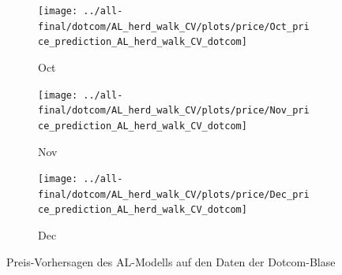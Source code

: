 \documentclass[ngerman]{ttlab-qualify}
\begin{document}
\begin{figure}[H]
\begin{subfigure}{.3\linewidth}
  \end{subfigure}\par\medskip
  \begin{subfigure}{.3\linewidth}
  \texttt{[image: ../all-final/dotcom/AL\_herd\_walk\_CV/plots/price/Oct\_price\_prediction\_AL\_herd\_walk\_CV\_dotcom]}\hfill
  \caption{Oct}
  \end{subfigure}
  \begin{subfigure}{.3\linewidth}
  \texttt{[image: ../all-final/dotcom/AL\_herd\_walk\_CV/plots/price/Nov\_price\_prediction\_AL\_herd\_walk\_CV\_dotcom]}\hfill
  \caption{Nov}
  \end{subfigure}
  \begin{subfigure}{.3\linewidth}
  \texttt{[image: ../all-final/dotcom/AL\_herd\_walk\_CV/plots/price/Dec\_price\_prediction\_AL\_herd\_walk\_CV\_dotcom]}\hfill
  \caption{Dec}
  \end{subfigure}
  \caption{Preis-Vorhersagen des AL-Modells auf den Daten der Dotcom-Blase}
\end{figure}
\end{document}

